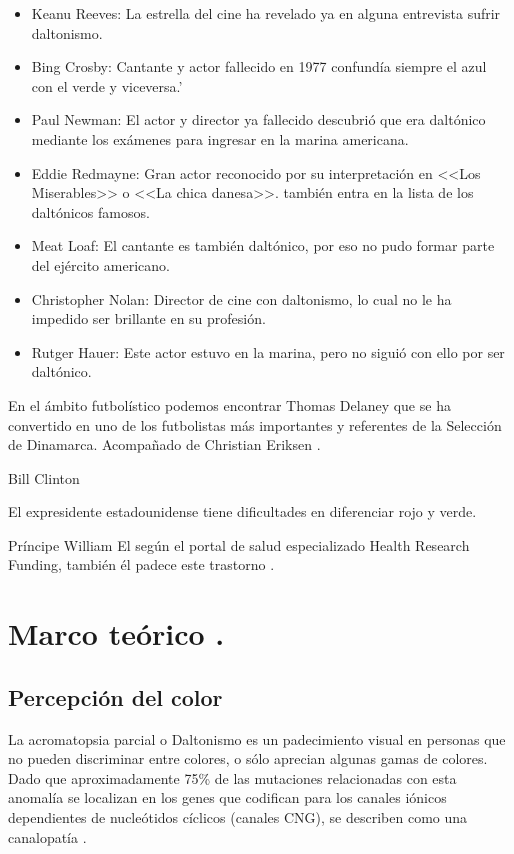 \documentclass[10pt]{article}
\begin{document}
\setlength{\parskip}{2mm}
\begin{itemize}
    \item Keanu Reeves: La estrella del cine ha revelado ya en alguna entrevista sufrir daltonismo.
    \item Bing Crosby: Cantante y actor fallecido en 1977 confundía siempre el azul con el verde y viceversa.'
    \item Paul Newman: El actor y director ya fallecido descubrió que era daltónico mediante los exámenes para ingresar en la marina americana.
    \item Eddie Redmayne: Gran actor reconocido por su interpretación en <<Los Miserables>> o <<La chica danesa>>. también entra en la lista de los daltónicos famosos.
    \item Meat Loaf: El cantante es también daltónico, por eso no pudo formar parte del ejército americano.
    \item Christopher Nolan: Director de cine con daltonismo, lo cual no le ha impedido ser brillante en su profesión.
    \item Rutger Hauer: Este actor estuvo en la marina, pero no siguió con ello por ser daltónico.
\end{itemize}

\cite{IEEEreferencias:Ref9}

En el ámbito futbolístico podemos encontrar 
Thomas Delaney que se ha convertido en uno de los futbolistas más importantes y referentes de la Selección de Dinamarca. Acompañado de Christian Eriksen \cite{IEEEreferencias:Ref10}.
\setlength{\parskip}{2mm}

Bill Clinton

El expresidente estadounidense tiene dificultades en diferenciar rojo y verde.

\setlength{\parskip}{2mm}

Príncipe William
El según el portal de salud especializado Health Research Funding, también él padece este trastorno \cite{IEEEreferencias:Ref11}.

\section{Marco teórico .}
\subsection{Percepción del color} 

La acromatopsia parcial o Daltonismo es un padecimiento visual en personas que no pueden discriminar entre colores, o sólo aprecian algunas gamas de colores. Dado que aproximadamente 75\% de las mutaciones relacionadas con esta anomalía se localizan en los genes que codifican para los canales iónicos dependientes de nucleótidos cíclicos (canales CNG), se describen como una canalopatía \cite{IEEEreferencias:Ref12}.
\end{document}
